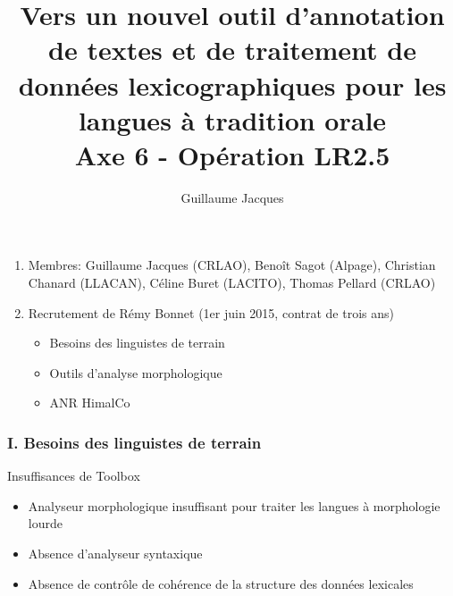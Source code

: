\documentclass[xcolor=table]{beamer}
\begin{document}
 \title{Vers un nouvel outil d'annotation de textes et de traitement de données lexicographiques pour les langues à tradition orale\\Axe 6 - Opération LR2.5}
 \author{Guillaume Jacques}
 \maketitle


 \begin{frame} 
 \frametitle{ }
 \begin{enumerate}%
 \item Membres: Guillaume Jacques (CRLAO), Benoît Sagot (Alpage), Christian Chanard (LLACAN), Céline Buret (LACITO), Thomas Pellard (CRLAO)
 \item Recrutement de Rémy Bonnet (1er juin 2015, contrat de trois ans)
  \begin{itemize}
\item Besoins des linguistes de terrain
\item Outils d'analyse morphologique
\item ANR HimalCo
 \end{itemize}
 \end{enumerate}

\end{frame}

 \begin{frame} 
 \frametitle{I. Besoins des linguistes de terrain}
  Insuffisances de Toolbox 
 \begin{itemize}
 \item Analyseur morphologique insuffisant pour traiter les langues à morphologie lourde
 \item Absence d'analyseur syntaxique
 \item Absence de contrôle de cohérence de la structure des données lexicales
 \end{itemize}
\end{frame}
\end{document}
